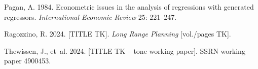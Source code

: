 Pagan, A. 1984. Econometric issues in the analysis of regressions with generated regressors. \emph{International Economic Review} 25: 221--247. %

Ragozzino, R. 2024. [TITLE TK]. \emph{Long Range Planning} [vol./pages TK]. %

Thewissen, J., et~al. 2024. [TITLE TK -- tone working paper]. SSRN working paper 4900453. %
